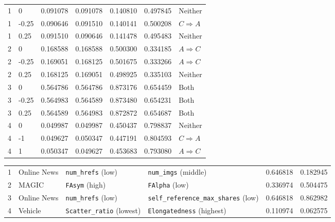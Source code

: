 \begin{tabular}{lllllll}
1 & 0 & 0.091078 & 0.091078 & 0.140810 & 0.497845 & Neither \\
1 & -0.25 & 0.090646 & 0.091510 & 0.140141 & 0.500208 & $C\Rightarrow A$ \\
1 & 0.25 & 0.091510 & 0.090646 & 0.141478 & 0.495483 & Neither \\
2 & 0 & 0.168588 & 0.168588 & 0.500300 & 0.334185 & $A\Rightarrow C$ \\
2 & -0.25 & 0.169051 & 0.168125 & 0.501675 & 0.333266 & $A\Rightarrow C$ \\
2 & 0.25 & 0.168125 & 0.169051 & 0.498925 & 0.335103 & Neither \\
3 & 0 & 0.564786 & 0.564786 & 0.873176 & 0.654459 & Both \\
3 & -0.25 & 0.564983 & 0.564589 & 0.873480 & 0.654231 & Both \\
3 & 0.25 & 0.564589 & 0.564983 & 0.872872 & 0.654687 & Both \\
4 & 0 & 0.049987 & 0.049987 & 0.450437 & 0.798837 & Neither \\
4 & -1 & 0.049627 & 0.050347 & 0.447191 & 0.804593 & $C\Rightarrow A$ \\
4 & 1 & 0.050347 & 0.049627 & 0.453683 & 0.793080 & $A\Rightarrow C$ \\
\end{tabular}
\begin{tabular}{llllll}
1 & Online News & \texttt{num\_hrefs} (low) & \texttt{num\_imgs} (middle) & 0.646818 & 0.182945 \\
2 & MAGIC & \texttt{FAsym} (high) & \texttt{FAlpha} (low) & 0.336974 & 0.504475 \\
3 & Online News & \texttt{num\_hrefs} (low) & \texttt{self\_reference\_max\_shares} (low) & 0.646818 & 0.862982 \\
4 & Vehicle & \texttt{Scatter\_ratio} (lowest) & \texttt{Elongatedness} (highest) & 0.110974 & 0.062575 \\
\end{tabular}
